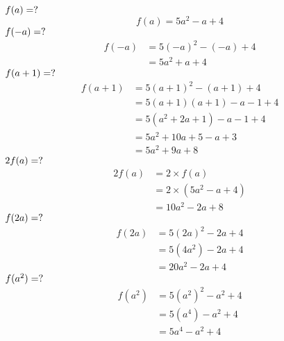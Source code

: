 \documentclass{article}
\begin{document}
$f(a) = \space ?$
\begin{equation}
    f(a)  = 5a^2 - a + 4
\end{equation}
\newline\newline
$f(-a) = \space ?$
\begin{equation}
\begin{split}
    f(-a) & = 5(-a)^2 - (-a) + 4 \\
    & = 5a^2 + a + 4
\end{split}
\end{equation}
\newline\newline
$f(a + 1) = \space ?$
\begin{equation}
\begin{split}
    f(a + 1) & = 5(a + 1)^2 - (a + 1) + 4 \\
    & = 5 (a + 1)(a + 1) - a - 1 + 4 \\
    & = 5(a^2 + 2a + 1) - a - 1 + 4 \\
    & = 5a^2 + 10a + 5 -a + 3 \\
    & = 5a^2 + 9a + 8
\end{split}
\end{equation}
\newline\newline
$2f(a) = \space ?$
\begin{equation}
\begin{split}
    2f(a) & = 2\times f(a) \\
    & = 2 \times (5a^2 - a + 4) \\
    & = 10a^2 - 2a + 8    
\end{split}
\end{equation}
\newline\newline
$f(2a) = \space ?$
\begin{equation}
\begin{split}
    f(2a) & = 5(2a)^2 - 2a + 4 \\
    & = 5(4a^2) - 2a + 4 \\
    & = 20a^2 -2a + 4     
\end{split}
\end{equation}
\newline\newline
$f(a^2) = \space ?$
\begin{equation}
\begin{split}
    f(a^2) & = 5(a^2)^2 - a^2 + 4 \\
    & = 5(a^4) - a^2 + 4 \\
    & = 5a^4 - a^2 + 4     
\end{split}
\end{equation}
\end{document}
